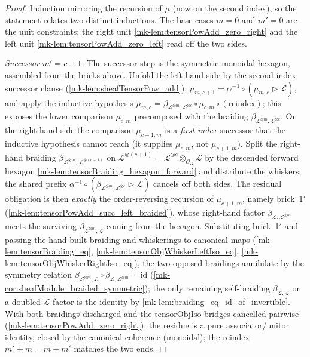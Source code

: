 \begin{proof}
  Induction mirroring the recursion of \(\mu\) (now on the second index), so the
  statement relates two distinct inductions. The base cases \(m = 0\) and
  \(m' = 0\) are the unit constraints: the right unit
  \ref{mk-lem:tensorPowAdd_zero_right} and the left unit
  \ref{mk-lem:tensorPowAdd_zero_left} read off the two sides.

  \emph{Successor \(m' = c+1\).} The successor step is the symmetric-monoidal
  hexagon, assembled from the bricks above. Unfold the left-hand side by the
  second-index successor clause (\ref{mk-lem:sheafTensorPow_add}), \(\mu_{m,c+1} =
  \alpha^{-1}\circ(\mu_{m,c}\rhd\mathcal{L})\), and apply the inductive hypothesis
  \(\mu_{m,c} = \beta_{\mathcal{L}^{\otimes m},\mathcal{L}^{\otimes c}}\circ
  \mu_{c,m}\circ(\text{reindex})\); this exposes the lower comparison
  \(\mu_{c,m}\) precomposed with the braiding
  \(\beta_{\mathcal{L}^{\otimes m},\mathcal{L}^{\otimes c}}\). On the right-hand
  side the comparison \(\mu_{c+1,m}\) is a \emph{first-index} successor that the
  inductive hypothesis cannot reach (it supplies \(\mu_{c,m}\), not
  \(\mu_{c+1,m}\)). Split the right-hand braiding
  \(\beta_{\mathcal{L}^{\otimes m},\,\mathcal{L}^{\otimes(c+1)}}\) on
  \(\mathcal{L}^{\otimes(c+1)}=\mathcal{L}^{\otimes c}\otimes_{\mathcal{O}_X}
  \mathcal{L}\) by the descended forward hexagon
  \ref{mk-lem:tensorBraiding_hexagon_forward} and distribute the whiskers; the
  shared prefix \(\alpha^{-1}\circ(\beta_{\mathcal{L}^{\otimes m},
  \mathcal{L}^{\otimes c}}\rhd\mathcal{L})\) cancels off both sides. The residual
  obligation is then \emph{exactly} the order-reversing recursion of
  \(\mu_{c+1,m}\), namely brick~1\('\) (\ref{mk-lem:tensorPowAdd_succ_left_braided}),
  whose right-hand factor \(\beta_{\mathcal{L},\mathcal{L}^{\otimes m}}\) meets the
  surviving \(\beta_{\mathcal{L}^{\otimes m},\mathcal{L}}\) coming from the
  hexagon. Substituting brick~1\('\) and passing the hand-built braiding and
  whiskerings to canonical maps (\ref{mk-lem:tensorBraiding_eq},
  \ref{mk-lem:tensorObjWhiskerLeftIso_eq},
  \ref{mk-lem:tensorObjWhiskerRightIso_eq}), the two opposed braidings annihilate by
  the symmetry relation \(\beta_{\mathcal{L}^{\otimes m},\mathcal{L}}\circ
  \beta_{\mathcal{L},\mathcal{L}^{\otimes m}} = \mathrm{id}\)
  (\ref{mk-cor:sheafModule_braided_symmetric}); the only remaining self-braiding
  \(\beta_{\mathcal{L},\mathcal{L}}\) on a doubled \(\mathcal{L}\)-factor is the
  identity by \ref{mk-lem:braiding_eq_id_of_invertible}. With both braidings
  discharged and the \(\mathrm{tensorObjIso}\) bridges cancelled pairwise
  (\ref{mk-lem:tensorPowAdd_zero_right}), the residue is a pure
  associator/unitor identity, closed by the canonical coherence
  (\(\mathrm{monoidal}\)); the reindex \(m'+m=m+m'\) matches the two ends.
\end{proof}

